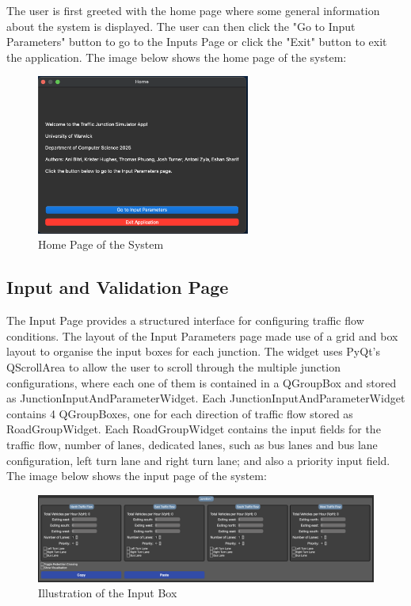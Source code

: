 \documentclass{article}
\begin{document}
    The user is first greeted with the home page where some general information about the system is displayed. The user can then click the "Go to Input Parameters" button to go to the Inputs Page
    or click the "Exit" button to exit the application. The image below shows the home page of the system:

    \begin{figure}[H]
        \centering
        \includegraphics[width=7cm]{homepage.png}
        \caption{Home Page of the System}
        \label{fig:homepage}
    \end{figure}

    \subsection{Input and Validation Page}

    The Input Page provides a structured interface for configuring traffic flow conditions. The layout of the Input Parameters page made use of a grid and box layout to organise the input boxes for each junction. The widget uses PyQt's QScrollArea to allow the user to scroll through the multiple junction configurations, where each one of them
    is contained in a QGroupBox and stored as JunctionInputAndParameterWidget. Each JunctionInputAndParameterWidget contains 4 QGroupBoxes, one for each direction of traffic flow stored as RoadGroupWidget. Each RoadGroupWidget contains the input fields for the
    traffic flow, number of lanes, dedicated lanes, such as bus lanes and bus lane configuration, left turn lane and right turn lane; and also a priority input field. The image below shows the input page of the system:

    \begin{figure}[h!]
        \centering
        \includegraphics[width=\textwidth]{parameter.png}
        \caption{Illustration of the Input Box}
        \label{fig:parameter}
    \end{figure}
\end{document}
